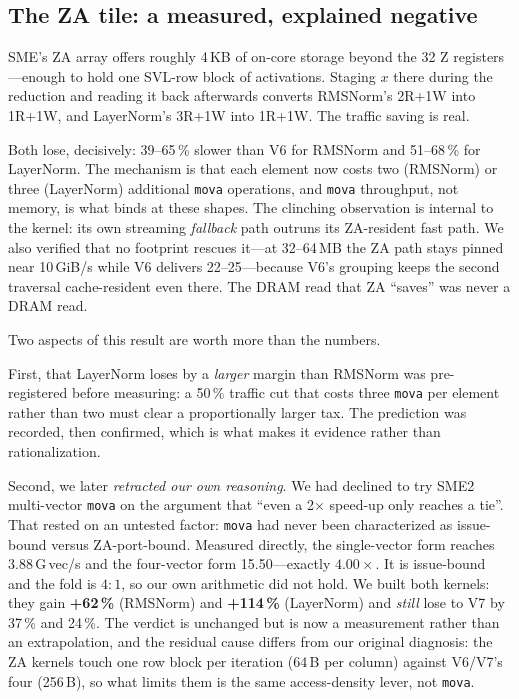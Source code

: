 \documentclass[conference,10pt]{IEEEtran}
\newcommand{\code}[1]{\texttt{\small #1}}
\begin{document}
\subsection{The ZA tile: a measured, explained negative}
\label{sec:za}

SME's ZA array offers roughly 4\,KB of on-core storage beyond the 32 Z
registers---enough to hold one SVL-row block of activations. Staging $x$ there
during the reduction and reading it back afterwards converts RMSNorm's 2R+1W
into 1R+1W, and LayerNorm's 3R+1W into 1R+1W. The traffic saving is real.

Both lose, decisively: 39--65\,\% slower than V6 for RMSNorm and 51--68\,\% for
LayerNorm. The mechanism is that each element now costs two (RMSNorm) or three
(LayerNorm) additional \code{mova} operations, and \code{mova} throughput, not
memory, is what binds at these shapes. The clinching observation is internal to
the kernel: its own streaming \emph{fallback} path outruns its ZA-resident fast
path. We also verified that no footprint rescues it---at 32--64\,MB the ZA path
stays pinned near 10\,GiB/s while V6 delivers 22--25---because V6's grouping
keeps the second traversal cache-resident even there. The DRAM read that ZA
``saves'' was never a DRAM read.

Two aspects of this result are worth more than the numbers.

First, that LayerNorm loses by a \emph{larger} margin than RMSNorm was
pre-registered before measuring: a 50\,\% traffic cut that costs three
\code{mova} per element rather than two must clear a proportionally larger tax.
The prediction was recorded, then confirmed, which is what makes it evidence
rather than rationalization.

Second, we later \emph{retracted our own reasoning}. We had declined to try SME2
multi-vector \code{mova} on the argument that ``even a 2$\times$ speed-up only
reaches a tie''. That rested on an untested factor: \code{mova} had never been
characterized as issue-bound versus ZA-port-bound. Measured directly, the
single-vector form reaches 3.88\,G\,vec/s and the four-vector form
15.50---exactly $4.00\times$. It is issue-bound and the fold is $4{:}1$, so our
own arithmetic did not hold. We built both kernels: they gain \textbf{+62\,\%}
(RMSNorm) and \textbf{+114\,\%} (LayerNorm) and \emph{still} lose to V7 by
37\,\% and 24\,\%. The verdict is unchanged but is now a measurement rather than
an extrapolation, and the residual cause differs from our original diagnosis:
the ZA kernels touch one row block per iteration (64\,B per column) against
V6/V7's four (256\,B), so what limits them is the same access-density lever, not
\code{mova}.
\end{document}
